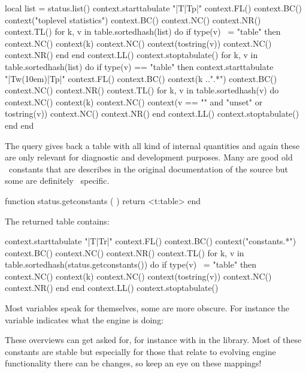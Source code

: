 \startluacode
    local list = status.list()
    context.starttabulate { "|T|Tp|" }
        context.FL()
        context.BC() context("toplevel statistics")
        context.BC()
        context.NC() context.NR()
        context.TL()
        for k, v in table.sortedhash(list) do
            if type(v) ~= "table" then
                context.NC() context(k)
                context.NC() context(tostring(v))
                context.NC() context.NR()
            end
        end
        context.LL()
    context.stoptabulate()
    for k, v in table.sortedhash(list) do
        if type(v) == "table" then
            context.starttabulate { "|Tw(10em)|Tp|" }
                context.FL()
                context.BC() context(k ..".*")
                context.BC()
                context.NC() context.NR()
                context.TL()
                for k, v in table.sortedhash(v) do
                    context.NC() context(k)
                    context.NC() context(v == "" and "unset" or tostring(v))
                    context.NC() context.NR()
                end
                context.LL()
            context.stoptabulate()
        end
    end
\stopluacode

The  query gives back a table with all kind of internal
quantities and again these are only relevant for diagnostic and development
purposes. Many are good old \TEX\ constants that are describes in the original
documentation of the source but some are definitely \LUAMETATEX\ specific.

\starttyping[option=LUA]
function status.getconstants ( )
    return <t:table>
end
\stoptyping

The returned table contains:

\startluacode
    context.starttabulate { "|T|Tr|" }
        context.FL()
        context.BC() context("constants.*")
        context.BC()
        context.NC() context.NR()
        context.TL()
        for k, v in table.sortedhash(status.getconstants()) do
            if type(v) ~= "table" then
                context.NC() context(k)
                context.NC() context(tostring(v))
                context.NC() context.NR()
            end
        end
        context.LL()
    context.stoptabulate()
\stopluacode

Most variables speak for themselves, some are more obscure. For instance the
 variable indicates what the engine is doing:


These overviews can get asked for, for instance with  in
the  library. Most of these constants are stable but especially for
those that relate to evolving engine functionality there can be changes, so keep
an eye on these mappings!


